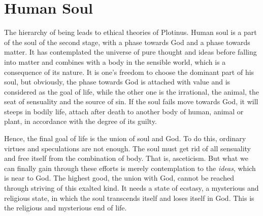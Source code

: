 \documentclass[11pt]{article}
\begin{document}
\section{Human Soul}
The hierarchy of being leads to ethical theories of Plotinus. 
Human soul is a part of the soul of the second stage, with a phase towards God and a phase towards matter. 
It has contemplated the universe of pure thought and ideas before falling into matter and combines with a body in the sensible world, which is a consequence of its nature. 
It is one’s freedom to choose the dominant part of his soul, but obviously, the phase towards God is attached with value and is considered as the goal of life, while the other one is the irrational, the animal, the seat of sensuality and the source of sin. 
If the soul fails move towards God, it will steeps in bodily life, attach after death to another body of human, animal or plant, in accordance with the degree of its guilty.

\newline

Hence, the final goal of life is the union of soul and God. 
To do this, ordinary virtues and speculations are not enough. 
The soul must get rid of all sensuality and free itself from the combination of body. 
That is, asceticism. 
But what we can finally gain through these efforts is merely contemplation to the \textit{ideas}, which is near to God. 
The highest good, the union with God, cannot be reached through striving of this exalted kind. 
It needs a state of ecstasy, a mysterious and religious state, in which the soul transcends itself and loses itself in God. 
This is the religious and mysterious end of life.
\end{document}
